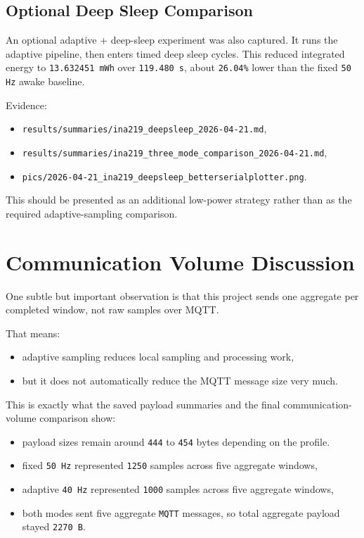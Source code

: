 \documentclass[12pt,a4paper]{article}
\begin{document}
\subsection*{Optional Deep Sleep Comparison}

An optional adaptive + deep-sleep experiment was also captured. It runs the
adaptive pipeline, then enters timed deep sleep cycles. This reduced integrated
energy to \texttt{13.632451 mWh} over \texttt{119.480 s}, about
\texttt{26.04\%} lower than the fixed \texttt{50 Hz} awake baseline.

Evidence:

\begin{itemize}
    \item \texttt{results/summaries/ina219\_deepsleep\_2026-04-21.md},
    \item \texttt{results/summaries/ina219\_three\_mode\_comparison\_2026-04-21.md},
    \item \texttt{pics/2026-04-21\_ina219\_deepsleep\_betterserialplotter.png}.
\end{itemize}

This should be presented as an additional low-power strategy rather than as
the required adaptive-sampling comparison.

\section{Communication Volume Discussion}

One subtle but important observation is that this project sends one aggregate
per completed window, not raw samples over MQTT.

That means:

\begin{itemize}
    \item adaptive sampling reduces local sampling and processing work,
    \item but it does not automatically reduce the MQTT message size very much.
\end{itemize}

This is exactly what the saved payload summaries and the final
communication-volume comparison show:

\begin{itemize}
    \item payload sizes remain around \texttt{444} to \texttt{454} bytes depending on the profile.
    \item fixed \texttt{50 Hz} represented \texttt{1250} samples across five aggregate windows,
    \item adaptive \texttt{40 Hz} represented \texttt{1000} samples across five aggregate windows,
    \item both modes sent five aggregate \texttt{MQTT} messages, so total aggregate payload stayed \texttt{2270 B}.
\end{itemize}
\end{document}
